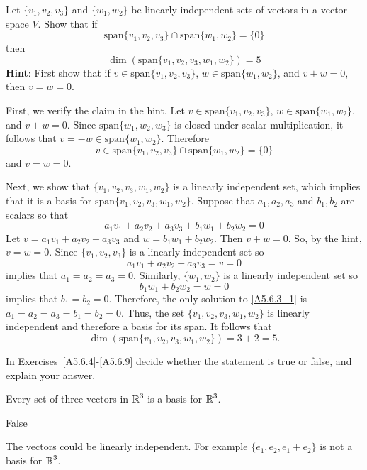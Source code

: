 \documentclass{ximera}
\begin{document}
\begin{exercise} \label{A5.6.3}
Let $\{v_1,v_2,v_3\}$ and $\{w_1,w_2\}$ be linearly independent sets of vectors in a vector space $V$. Show that if
\[
\text{span}\{v_1,v_2,v_3\} \cap \text{span}\{w_1,w_2\}=\{0\}
\]
then 
\[
\dim(\text{span}\{v_1,v_2,v_3,w_1,w_2\}) = 5
\]
{\bf Hint}: First show that if $v\in \text{span}\{v_1,v_2,v_3\}$, $w\in \text{span}\{w_1,w_2\}$, and $v+w=0$, then $v=w=0$. 


\begin{solution} 
\soln First, we verify the claim in the hint. Let $v\in \text{span}\{v_1,v_2,v_3\}$, $w\in \text{span}\{w_1,w_2\}$, and $v+w=0$. Since $\text{span}\{w_1,w_2,w_3\}$ is closed under scalar multiplication, it follows that $ v= -w \in  \text{span}\{w_1,w_2\}$. Therefore
\[
v\in \text{span}\{v_1,v_2,v_3\} \cap \text{span}\{w_1,w_2\} = \{0\}
\]
and $v = w = 0$.

Next, we show that $\{v_1,v_2,v_3,w_1,w_2 \}$ is a linearly independent set, which implies that it is a basis for $\text{span}\{v_1,v_2,v_3, w_1, w_2\}$.  Suppose that $a_1,a_2, a_3$ and $b_1, b_2$ are scalars so that
\begin{equation} \label{A5.6.3_1}
a_1 v_1 + a_2 v_2 + a_3 v_3 + b_1 w_1 + b_2 w_2 = 0
\end{equation}
Let $v = a_1 v_1 + a_2 v_2 + a_3 v_3$ and $w = b_1 w_1 + b_2 w_2$.  Then $v + w = 0$. So, by the hint, $v = w = 0$.  Since $\{v_1,v_2,v_3\}$ is a linearly independent set so
\[
a_1 v_1 + a_2 v_2 + a_3 v_3 = v =0
\]
implies that $a_1 = a_2 = a_3 = 0$.  Similarly, $\{w_1, w_2\}$ is a linearly independent set so
\[
b_1 w_1 + b_2 w_2 = w = 0
\]
implies that $b_1 = b_2 = 0$.  Therefore, the only solution to \eqref{A5.6.3_1} is 
$a_1 = a_2 = a_3 = b_1 = b_2 = 0$.  Thus, the set $\{v_1,v_2,v_3,w_1,w_2\}$ is linearly independent and therefore a basis for its span.  It follows that
\[
\dim(\text{span}\{v_1,v_2,v_3,w_1,w_2\}) = 3 + 2 = 5.
\]
\end{solution}
\end{exercise}

In Exercises~\ref{A5.6.4}-\ref{A5.6.9} decide whether the statement is true or false, and explain your answer.

\begin{exercise}  \label{A5.6.4}
Every set of three vectors in $\mbox{$\Bbb{R}$}^3$ is a basis for $\mbox{$\Bbb{R}$}^3$.
\begin{solution}
\ans False  

\soln
The vectors could be linearly independent. For example $\{e_1,e_2,e_1+e_2\}$ is not a basis for $\mbox{$\Bbb{R}$}^3$.
\end{solution}
\end{exercise}
\end{document}
